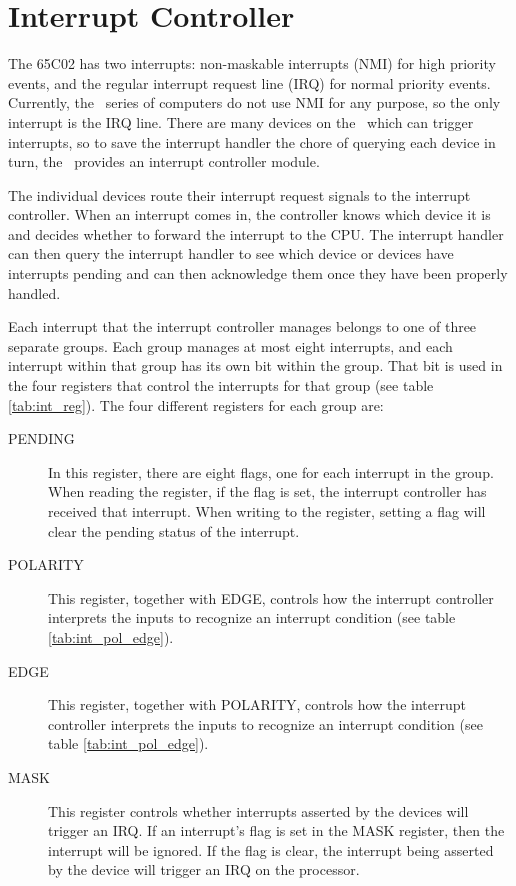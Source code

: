 \chapter{Interrupt Controller}
\label{chap:interrupts}

The 65C02 has two interrupts: non-maskable interrupts (NMI) for high priority events, and the regular interrupt request line (IRQ) for normal priority events. Currently, the \jr\ series of computers do not use NMI for any purpose, so the only interrupt is the IRQ line. There are many devices on the \jr\ which can trigger interrupts, so to save the interrupt handler the chore of querying each device in turn, the \jr\ provides an interrupt controller module.

The individual devices route their interrupt request signals to the interrupt controller. When an interrupt comes in, the controller knows which device it is and decides whether to forward the interrupt to the CPU. The interrupt handler can then query the interrupt handler to see which device or devices have interrupts pending and can then acknowledge them once they have been properly handled.

Each interrupt that the interrupt controller manages belongs to one of three separate groups. Each group manages at most eight interrupts, and each interrupt within that group has its own bit within the group. That bit is used in the four registers that control the interrupts for that group (see table \ref{tab:int_reg}). The four different registers for each group are:

\begin{description}
    \item[PENDING] In this register, there are eight flags, one for each interrupt in the group. When reading the register, if the flag is set, the interrupt controller has received that interrupt. When writing to the register, setting a flag will clear the pending status of the interrupt.
    \item[POLARITY] This register, together with EDGE, controls how the interrupt controller interprets the inputs to recognize an interrupt condition (see table \ref{tab:int_pol_edge}).
    \item[EDGE] This register, together with POLARITY, controls how the interrupt controller interprets the inputs to recognize an interrupt condition (see table \ref{tab:int_pol_edge}).
    \item[MASK] This register controls whether interrupts asserted by the devices will trigger an IRQ. If an interrupt's flag is set in the MASK register, then the interrupt will be ignored. If the flag is clear, the interrupt being asserted by the device will trigger an IRQ on the processor.
\end{description}

